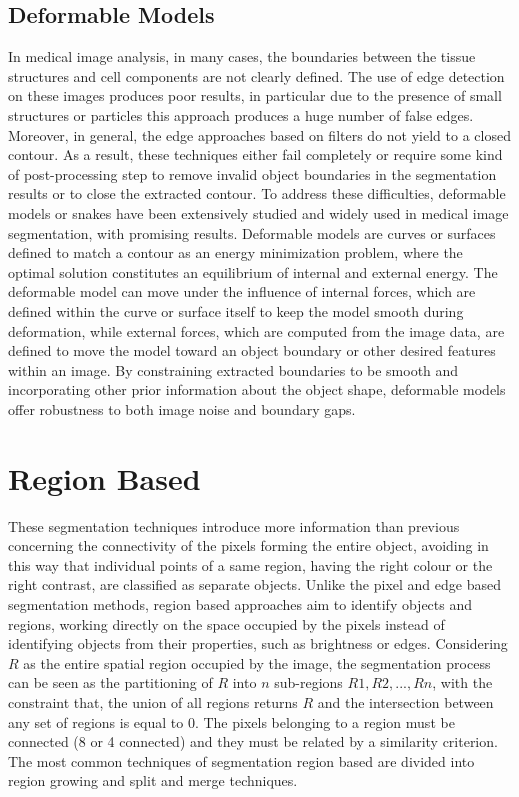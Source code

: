\documentclass[final,a4paper,12pt,english]{UnicaPhdThesis3}
\begin{document}
\subsection{Deformable Models} %
In medical image analysis, in many cases, the boundaries between the tissue structures and cell components are not clearly defined. The use of edge detection on these images produces poor results, in particular due to the presence of small structures or particles this approach produces a huge number of false edges. Moreover, in general, the edge approaches based on filters do not yield to a closed contour. As a result, these techniques either fail completely or require some kind of post-processing step to remove invalid object boundaries in the segmentation results or to close the extracted contour. To address these difficulties, deformable models or snakes \cite{Kass} have been extensively studied and widely used in medical image segmentation, with promising results. Deformable models are curves or surfaces defined to match a contour as an energy minimization problem, where the optimal solution constitutes an equilibrium of internal and external energy. The deformable model can move under the influence of internal forces, which are defined within the curve or surface itself to keep the model smooth during deformation, while external forces, which are computed from the image data, are defined to move the model toward an object boundary or other desired features within an image. By constraining extracted boundaries to be smooth and incorporating other prior information about the object shape, deformable models offer robustness to both image noise and boundary gaps.

\section{Region Based} %
These segmentation techniques introduce more information than previous concerning the connectivity of the pixels forming the entire object, avoiding in this way that individual points of a same region, having the right colour or the right contrast, are classified as separate objects. Unlike the pixel and edge based segmentation methods, region based approaches aim to identify objects and regions, working directly on the space occupied by the pixels instead of identifying objects from their properties, such as brightness or edges. Considering $R$ as the entire spatial region occupied by the image, the segmentation process can be seen as the partitioning of $R$ into $n$ sub-regions $R1, R2, ..., Rn$, with the constraint that, the union of all regions returns $R$ and the intersection between any set of regions is equal to $0$. The pixels belonging to a region must be connected (8 or 4 connected) and they must be related by a similarity criterion. The most common techniques of segmentation region based are divided into region growing and split and merge techniques.
\end{document}
